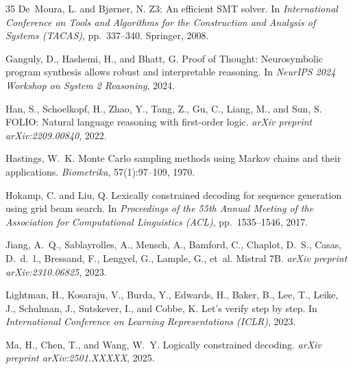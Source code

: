 \documentclass[twoside,11pt]{article}
\begin{document}
\begin{thebibliography}{35}
De~Moura, L. and Bj{\o}rner, N.
\newblock Z3: An efficient SMT solver.
\newblock In \emph{International Conference on Tools and Algorithms for the
Construction and Analysis of Systems (TACAS)}, pp.\ 337--340. Springer,
2008.

Ganguly, D., Hashemi, H., and Bhatt, G.
\newblock Proof of Thought: Neurosymbolic program synthesis allows robust
and interpretable reasoning.
\newblock In \emph{NeurIPS 2024 Workshop on System 2 Reasoning}, 2024.

Han, S., Schoelkopf, H., Zhao, Y., Tang, Z., Gu, C., Liang, M., and
Sun, S.
\newblock FOLIO: Natural language reasoning with first-order logic.
\newblock \emph{arXiv preprint arXiv:2209.00840}, 2022.

Hastings, W.~K.
\newblock Monte {C}arlo sampling methods using {M}arkov chains and their
applications.
\newblock \emph{Biometrika}, 57(1):97--109, 1970.

Hokamp, C. and Liu, Q.
\newblock Lexically constrained decoding for sequence generation using grid
beam search.
\newblock In \emph{Proceedings of the 55th Annual Meeting of the Association
for Computational Linguistics (ACL)}, pp.\ 1535--1546, 2017.

Jiang, A.~Q., Sablayrolles, A., Mensch, A., Bamford, C., Chaplot, D.~S.,
Casas, D.~d.~l., Bressand, F., Lengyel, G., Lample, G., et~al.
\newblock Mistral 7{B}.
\newblock \emph{arXiv preprint arXiv:2310.06825}, 2023.

Lightman, H., Kosaraju, V., Burda, Y., Edwards, H., Baker, B., Lee, T.,
Leike, J., Schulman, J., Sutskever, I., and Cobbe, K.
\newblock Let's verify step by step.
\newblock In \emph{International Conference on Learning Representations
(ICLR)}, 2023.

Ma, H., Chen, T., and Wang, W.~Y.
\newblock Logically constrained decoding.
\newblock \emph{arXiv preprint arXiv:2501.XXXXX}, 2025.


\end{thebibliography}
\end{document}
